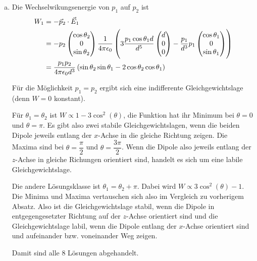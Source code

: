 \documentclass[a4paper,german,12pt,smallheadings]{scrartcl}
\begin{document}
\begin{enumerate}[a)]
  \item
    Die Wechselwikungsenergie von $p_1$ auf $p_2$ ist
    \begin{align*}
      W_1 &= - \vec{p}_2 \cdot \vec{E}_1 \\
        &= - p_2 \begin{pmatrix}
          \cos \theta_2 \\ 0 \\ \sin \theta_2
        \end{pmatrix}
        \frac{1}{4 \pi \epsilon_0} \del {
          3 \frac{p_1 \cos \theta_1 d}{d^5} \begin{pmatrix}
            d \\ 0 \\ 0
          \end{pmatrix}
          -
          \frac{p_1}{d^3} p_1 \begin{pmatrix}
            \cos \theta_1 \\ 0 \\ \sin \theta_1
          \end{pmatrix}
        } \\
        &= \frac{p_1 p_2}{4 \pi \epsilon_0 d^3 } \del{
          \sin \theta_2 \sin \theta_1 - 2 \cos \theta_2 \cos \theta_1
        }
    \end{align*}

    Für die Möglichkeit $p_1 = p_2$ ergibt sich eine indifferente
    Gleichgewichtslage (denn $W = 0$ konstant).

    Für $\theta_1 = \theta_2$ ist $W \propto 1 - 3 \cos^2(\theta)$, die
    Funktion hat ihr Minimum bei $\theta = 0$ und $\theta = \pi$. Es gibt also
    zwei stabile Gleichgewichtslagen, wenn die beiden Dipole jeweils entlang
    der $x$-Achse in die gleiche Richtung zeigen. Die Maxima sind bei $\theta =
    \dfrac{\pi}{2}$ und $\theta = \dfrac{3 \pi}{2}$. Wenn die Dipole also
    jeweils entlang der $z$-Achse in gleiche Richungen orientiert sind, handelt
    es sich um eine labile Gleichgewichtslage.

    Die andere Lösungsklasse ist $\theta_1 = \theta_2 + \pi$. Dabei wird $W
    \propto 3 \cos^2(\theta) - 1$. Die Minima und Maxima vertauschen sich also
    im Vergleich zu vorherigem Absatz.
    Also ist die Gleichgewichtslage stabil, wenn die Dipole in
    entgegengesetzter Richtung auf der $z$-Achse orientiert sind und die
    Gleichgewichtslage labil, wenn die Dipole entlang der $x$-Achse orientiert sind
    und aufeinander bzw. voneinander Weg zeigen.

    Damit sind alle 8 Lösungen abgehandelt.



\end{enumerate}
\end{document}
